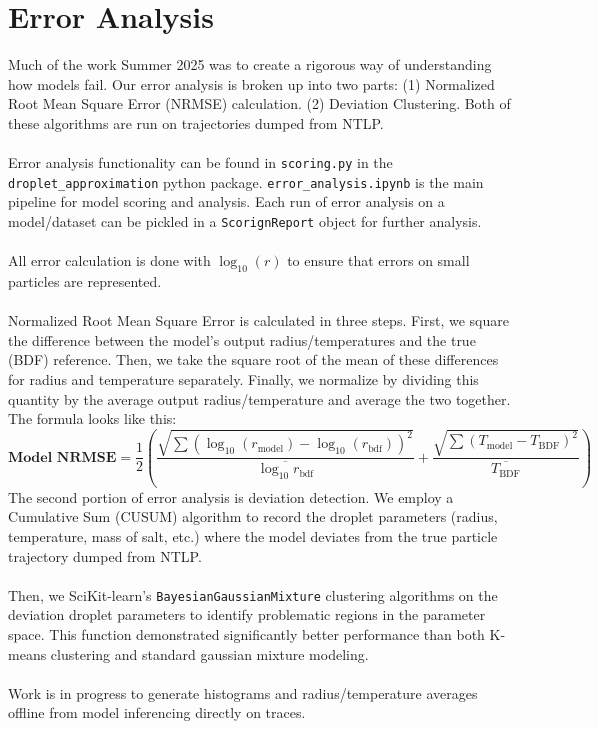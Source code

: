 \documentclass{article}
\begin{document}
\section{Error Analysis}
Much of the work Summer 2025 was to create a rigorous way of understanding how models fail. Our error analysis is broken up into two parts: (1) Normalized Root Mean Square Error (NRMSE) calculation. (2) Deviation Clustering. Both of these algorithms are run on trajectories dumped from NTLP.\\\\
Error analysis functionality can be found in \lstinline{scoring.py} in the \lstinline{droplet_approximation} python package. \lstinline{error_analysis.ipynb} is the main pipeline for model scoring and analysis. Each run of error analysis on a model/dataset can be pickled in a \lstinline{ScorignReport} object for further analysis.\\\\
All error calculation is done with $\log_{10}(r)$ to ensure that errors on small particles are represented.\\\\
Normalized Root Mean Square Error is calculated in three steps. First, we square the difference between the model's output radius/temperatures and the true (BDF) reference. Then, we take the square root of the mean of these differences for radius and temperature separately. Finally, we normalize by dividing this quantity by the average output radius/temperature and average the two together. The formula looks like this:
\[
	\textbf{Model NRMSE} = \frac{1}{2}\left(\frac{\sqrt{\sum (\log_{10}(r_\text{model}) - \log_{10}(r_\text{bdf}))^2}}{\overline{ \log_{10} r_\text{bdf}}} + \frac{\sqrt{\sum (T_\text{model} - T_\text{BDF})^2}}{\overline{ T_\text{BDF} }}\right)
\]
The second portion of error analysis is deviation detection. We employ a Cumulative Sum (CUSUM) algorithm to record the droplet parameters (radius, temperature, mass of salt, etc.) where the model deviates from the true particle trajectory dumped from NTLP.\\\\
Then, we SciKit-learn's \lstinline{BayesianGaussianMixture} clustering algorithms on the deviation droplet parameters to identify problematic regions in the parameter space. This function demonstrated significantly better performance than both K-means clustering and standard gaussian mixture modeling.\\\\
Work is in progress to generate histograms and radius/temperature averages offline from model inferencing directly on traces.
\end{document}
